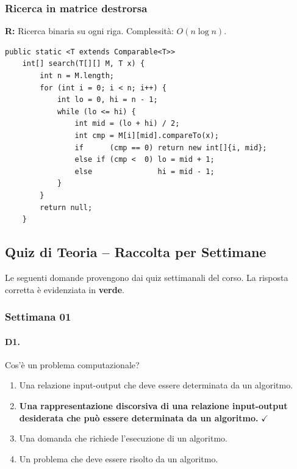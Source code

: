 \subsubsection*{Ricerca in matrice destrorsa}
\textbf{R:} Ricerca binaria su ogni riga. Complessità: $O(n\log n)$.
\begin{lstlisting}[basicstyle=\ttfamily\scriptsize]
	public static <T extends Comparable<T>>
	int[] search(T[][] M, T x) {
		int n = M.length;
		for (int i = 0; i < n; i++) {
			int lo = 0, hi = n - 1;
			while (lo <= hi) {
				int mid = (lo + hi) / 2;
				int cmp = M[i][mid].compareTo(x);
				if      (cmp == 0) return new int[]{i, mid};
				else if (cmp <  0) lo = mid + 1;
				else               hi = mid - 1;
			}
		}
		return null;
	}
\end{lstlisting}


\subsection{Quiz di Teoria -- Raccolta per Settimane}

\begin{softnote}
	Le seguenti domande provengono dai quiz settimanali del corso.
	La risposta corretta è evidenziata in \textcolor{correctgreen}{\textbf{verde}}.
\end{softnote}

\subsubsection{Settimana 01}

\paragraph{D1.} Cos'\`e un problema computazionale?
\begin{enumerate}[label=\Alph*.,leftmargin=*]
	\item Una relazione input-output che deve essere determinata da un algoritmo.
	\item \textcolor{correctgreen}{\textbf{Una rappresentazione discorsiva di una relazione input-output desiderata che pu\`o essere determinata da un algoritmo.}} \hfill\textcolor{correctgreen}{$\checkmark$}
	\item Una domanda che richiede l'esecuzione di un algoritmo.
	\item Un problema che deve essere risolto da un algoritmo.
\end{enumerate}

